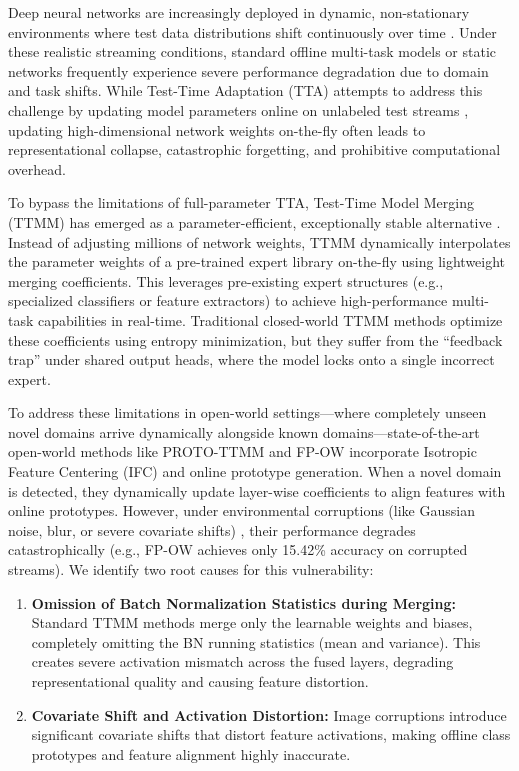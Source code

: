 \documentclass{article}
\begin{document}
Deep neural networks are increasingly deployed in dynamic, non-stationary environments where test data distributions shift continuously over time \cite{liang2023comprehensive, shao2022testing}. Under these realistic streaming conditions, standard offline multi-task models or static networks frequently experience severe performance degradation due to domain and task shifts. While Test-Time Adaptation (TTA) attempts to address this challenge by updating model parameters online on unlabeled test streams \cite{wang2021tent, boudiaf2022parameter}, updating high-dimensional network weights on-the-fly often leads to representational collapse, catastrophic forgetting, and prohibitive computational overhead.

To bypass the limitations of full-parameter TTA, Test-Time Model Merging (TTMM) has emerged as a parameter-efficient, exceptionally stable alternative \cite{yang2024adamerging, zhao2024test}. Instead of adjusting millions of network weights, TTMM dynamically interpolates the parameter weights of a pre-trained expert library on-the-fly using lightweight merging coefficients. This leverages pre-existing expert structures (e.g., specialized classifiers or feature extractors) to achieve high-performance multi-task capabilities in real-time. Traditional closed-world TTMM methods optimize these coefficients using entropy minimization, but they suffer from the ``feedback trap'' under shared output heads, where the model locks onto a single incorrect expert.

To address these limitations in open-world settings---where completely unseen novel domains arrive dynamically alongside known domains---state-of-the-art open-world methods like PROTO-TTMM and FP-OW \cite{luan2026fpca, shao2026iggs} incorporate Isotropic Feature Centering (IFC) and online prototype generation. When a novel domain is detected, they dynamically update layer-wise coefficients to align features with online prototypes. However, under environmental corruptions (like Gaussian noise, blur, or severe covariate shifts) \cite{hendrycks2019benchmarking}, their performance degrades catastrophically (e.g., FP-OW achieves only 15.42\% accuracy on corrupted streams). We identify two root causes for this vulnerability:
\begin{enumerate}
    \item \textbf{Omission of Batch Normalization Statistics during Merging:} Standard TTMM methods merge only the learnable weights and biases, completely omitting the BN running statistics (mean and variance). This creates severe activation mismatch across the fused layers, degrading representational quality and causing feature distortion.
    \item \textbf{Covariate Shift and Activation Distortion:} Image corruptions introduce significant covariate shifts that distort feature activations, making offline class prototypes and feature alignment highly inaccurate.
\end{enumerate}
\end{document}
